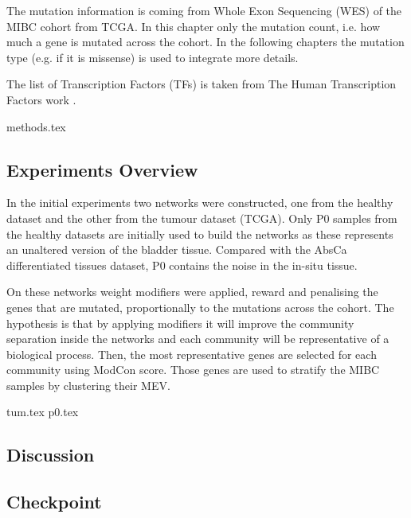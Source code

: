 The mutation information is coming from Whole Exon Sequencing (WES) of the MIBC cohort from TCGA. In this chapter only the mutation count, i.e. how much a gene is mutated across the cohort. In the following chapters the mutation type (e.g. if it is missense) is used to integrate more details.

The list of Transcription Factors (TFs) is taken from The Human Transcription Factors work \citet{Lambert2018-el}.





{methods.tex}

\newpage

\subsection{Experiments Overview}


In the initial experiments two networks were constructed, one from the healthy dataset and the other from the tumour dataset (TCGA). Only P0 samples from the healthy datasets are initially used to build the networks as these represents an unaltered version of the bladder tissue. Compared with the AbsCa differentiated tissues dataset, P0 contains the noise in the in-situ tissue.

On these networks weight modifiers were applied, reward and penalising the genes that are mutated, proportionally to the mutations across the cohort. The hypothesis is that by applying modifiers it will improve the community separation inside the networks and each community will be representative of a biological process. Then, the most representative genes are selected for each community using ModCon score. Those  genes are used to stratify the MIBC samples by clustering their MEV.

{tum.tex}
\newpage
{p0.tex}
\newpage



\newpage

\subsection{Discussion}


\subsection{Checkpoint}



